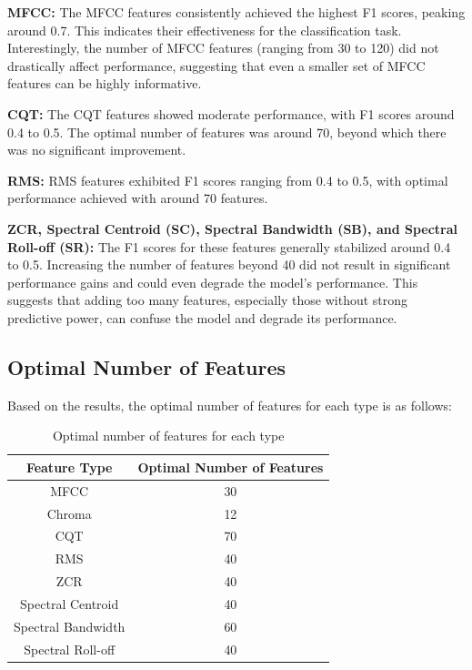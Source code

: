 \textbf{MFCC:} The MFCC features consistently achieved the highest F1 scores, peaking around 0.7. This indicates their effectiveness for the classification task. Interestingly, the number of MFCC features (ranging from 30 to 120) did not drastically affect performance, suggesting that even a smaller set of MFCC features can be highly informative.

\textbf{CQT:} The CQT features showed moderate performance, with F1 scores around 0.4 to 0.5. The optimal number of features was around 70, beyond which there was no significant improvement.

\textbf{RMS:} RMS features exhibited F1 scores ranging from 0.4 to 0.5, with optimal performance achieved with around 70 features.

\textbf{ZCR, Spectral Centroid (SC), Spectral Bandwidth (SB), and Spectral Roll-off (SR):} The F1 scores for these features generally stabilized around 0.4 to 0.5. Increasing the number of features beyond 40 did not result in significant performance gains and could even degrade the model's performance. This suggests that adding too many features, especially those without strong predictive power, can confuse the model and degrade its performance.

\subsection{Optimal Number of Features}

Based on the results, the optimal number of features for each type is as follows:
\begin{table}[h]
    \centering
    \small
    \begin{tabular}{|c|c|}
        \hline
        \textbf{Feature Type} & \textbf{Optimal Number of Features} \\
        \hline
        MFCC & 30 \\
        Chroma & 12 \\
        CQT & 70 \\
        RMS & 40 \\
        ZCR & 40 \\
        Spectral Centroid & 40 \\
        Spectral Bandwidth & 60 \\
        Spectral Roll-off & 40 \\
        \hline
    \end{tabular}
    \caption{Optimal number of features for each type}
    \label{tab:optimal_features}
\end{table}


